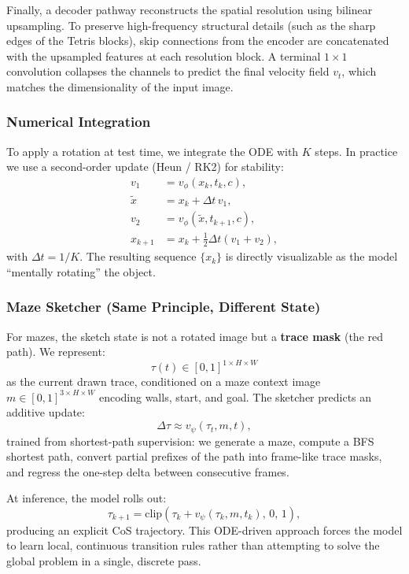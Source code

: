 \documentclass{l4proj}
\begin{document}
Finally, a decoder pathway reconstructs the spatial resolution using bilinear upsampling. To preserve high-frequency structural details (such as the sharp edges of the Tetris blocks), skip connections from the encoder are concatenated with the upsampled features at each resolution block. A terminal $1 \times 1$ convolution collapses the channels to predict the final velocity field $v_t$, which matches the dimensionality of the input image.

\subsubsection{Numerical Integration}
To apply a rotation at test time, we integrate the ODE with $K$ steps. In practice we use a second-order update (Heun / RK2) for stability:
\begin{align}
    v_1 &= v_\phi(x_k, t_k, c), \\
    \tilde{x} &= x_k + \Delta t \, v_1, \\
    v_2 &= v_\phi(\tilde{x}, t_{k+1}, c), \\
    x_{k+1} &= x_k + \tfrac{1}{2}\Delta t \left(v_1 + v_2\right),
\end{align}
with $\Delta t = 1/K$. The resulting sequence $\{x_k\}$ is directly visualizable as the model ``mentally rotating'' the object.

\subsubsection{Maze Sketcher (Same Principle, Different State)}
For mazes, the sketch state is not a rotated image but a \textbf{trace mask} (the red path). We represent:
\begin{equation}
    \tau(t) \in [0,1]^{1 \times H \times W}
\end{equation}
as the current drawn trace, conditioned on a maze context image $m \in [0,1]^{3 \times H \times W}$ encoding walls, start, and goal. The sketcher predicts an additive update:
\begin{equation}
    \Delta\tau \approx v_\psi(\tau_t, m, t),
\end{equation}
trained from shortest-path supervision: we generate a maze, compute a BFS shortest path, convert partial prefixes of the path into frame-like trace masks, and regress the one-step delta between consecutive frames.

At inference, the model rolls out:
\begin{equation}
    \tau_{k+1} = \mathrm{clip}\!\left(\tau_k + v_\psi(\tau_k, m, t_k),\, 0,\, 1\right),
\end{equation}
producing an explicit CoS trajectory. This ODE-driven approach forces the model to learn local, continuous transition rules rather than attempting to solve the global problem in a single, discrete pass.
\end{document}
